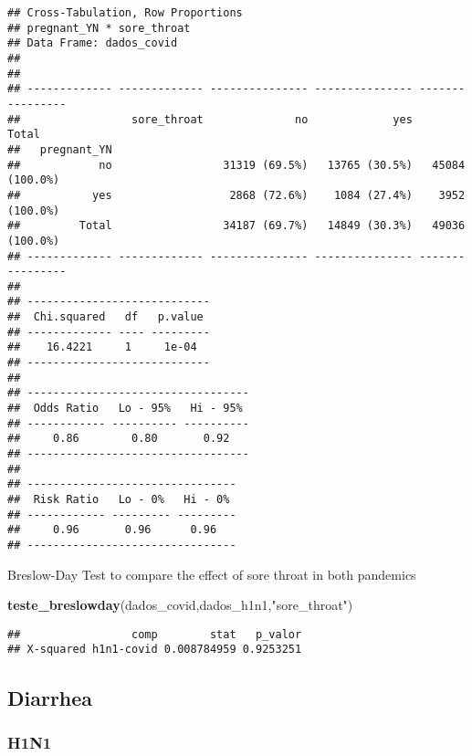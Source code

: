 \documentclass[
]{article}
\newenvironment{Shaded}{\begin{snugshade}}{\end{snugshade}}
\newcommand{\KeywordTok}[1]{\textcolor[rgb]{0.13,0.29,0.53}{\textbf{#1}}}
\newcommand{\NormalTok}[1]{#1}
\newcommand{\StringTok}[1]{\textcolor[rgb]{0.31,0.60,0.02}{#1}}
\begin{document}
\begin{verbatim}
## Cross-Tabulation, Row Proportions  
## pregnant_YN * sore_throat  
## Data Frame: dados_covid  
## 
## 
## ------------- ------------- --------------- --------------- ----------------
##                 sore_throat              no             yes            Total
##   pregnant_YN                                                               
##            no                 31319 (69.5%)   13765 (30.5%)   45084 (100.0%)
##           yes                  2868 (72.6%)    1084 (27.4%)    3952 (100.0%)
##         Total                 34187 (69.7%)   14849 (30.3%)   49036 (100.0%)
## ------------- ------------- --------------- --------------- ----------------
## 
## ----------------------------
##  Chi.squared   df   p.value 
## ------------- ---- ---------
##    16.4221     1     1e-04  
## ----------------------------
## 
## ----------------------------------
##  Odds Ratio   Lo - 95%   Hi - 95% 
## ------------ ---------- ----------
##     0.86        0.80       0.92   
## ----------------------------------
## 
## --------------------------------
##  Risk Ratio   Lo - 0%   Hi - 0% 
## ------------ --------- ---------
##     0.96       0.96      0.96   
## --------------------------------
\end{verbatim}

Breslow-Day Test to compare the effect of sore throat in both pandemics

\begin{Shaded}
\begin{Highlighting}[]
\KeywordTok{teste_breslowday}\NormalTok{(dados_covid,dados_h1n1,}\StringTok{"sore_throat"}\NormalTok{)}
\end{Highlighting}
\end{Shaded}

\begin{verbatim}
##                 comp        stat   p_valor
## X-squared h1n1-covid 0.008784959 0.9253251
\end{verbatim}

\hypertarget{diarrhea}{%
\subsection{Diarrhea}\label{diarrhea}}

\hypertarget{h1n1-15}{%
\subsubsection{H1N1}\label{h1n1-15}}
\end{document}
